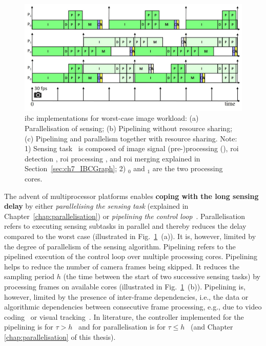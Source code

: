 \begin{figure}[t]
\centerline{\includegraphics[width=\textwidth]{images/ibc_gantt2.jpg}}
\vspace{-1ex}
\caption{\Gls{ibc} implementations for worst-case image workload: (a) Parallelisation of sensing; (b) Pipelining without resource sharing; (c) Pipelining and parallelism together with resource sharing. 
Note: 1) Sensing task \taskS~is composed of image signal (pre-)processing (\taskISP), \gls{roi} detection \taskRoID, \gls{roi} processing \taskRoIP, and \gls{roi} merging \taskRoIM explained in Section~\ref{sec:ch7_IBCGraph}; 2) \processor$_0$ and \processor$_1$ are the two processing cores.}
\label{fig:ch7_ibc_gantt}
\end{figure}

The advent of multiprocessor platforms enables \textbf{coping with the long sensing delay} by either \textit{parallelising the sensing task} (explained in Chapter~\ref{chap:parallelisation}) or \textit{pipelining the control loop}~\cite{krautgartner1998performance,medina2019designing}.
Parallelisation refers to executing sensing subtasks in parallel and thereby reduces the delay compared to the worst case (illustrated in Fig.~\ref{fig:ch7_ibc_gantt}~(a)).
It is, however, limited by the degree of parallelism of the sensing algorithm.
Pipelining refers to the pipelined execution of the control loop over multiple processing cores. 
Pipelining helps to reduce the number of camera frames being skipped. It reduces the sampling period $h$ (the time between the start of two successive sensing tasks) by processing frames on available cores (illustrated in Fig.~\ref{fig:ch7_ibc_gantt}~(b)).
Pipelining is, however, limited by the presence of inter-frame dependencies, i.e., the data or algorithmic dependencies between consecutive frame processing, e.g., due to video coding~\cite{li2015lagrangian} or visual tracking~\cite{smeulders2013visual}.
In literature, the controller implemented for the pipelining is for $\tau > h$~\cite{krautgartner1998performance,medina2019designing} and for parallelisation is for $\tau\le h$~\cite{mohamed2018optimising,mohamed2020scenario} (and Chapter \ref{chap:parallelisation} of this thesis).
\vspace{1mm}

